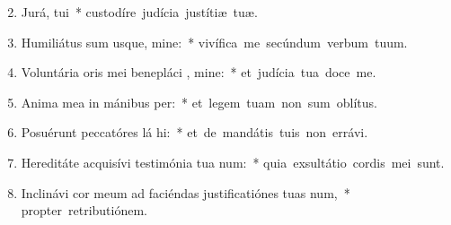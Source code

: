 \begin{flushleft}
\begin{enumerate}[leftmargin=*]
\setcounter{enumi}{1}

\item Jurá,  tui~* \mbox{custodíre judícia justítiæ tuæ.}
\item Humiliátus sum usque, mine:~* \mbox{vivífica me secúndum verbum tuum.}
\item Voluntária oris mei benepláci , mine:~* \mbox{et judícia tua doce me.}
\item Anima mea in mánibus  per:~* \mbox{et legem tuam non sum oblítus.}
\item Posuérunt peccatóres lá hi:~* \mbox{et de mandátis tuis non errávi.}
\item Hereditáte acquisívi testimónia tua  num:~* \mbox{quia exsultátio cordis mei sunt.}
\item Inclinávi cor meum ad faciéndas justificatiónes tuas  num,~* \mbox{propter retributiónem.}


\end{enumerate}
\end{flushleft}

